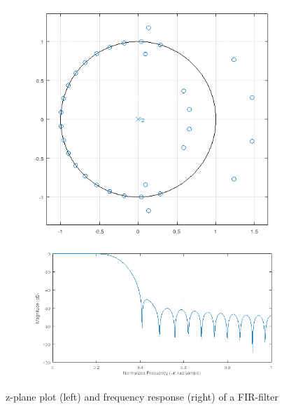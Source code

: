 \begin{figure}[!h]
    \begin{subfigure}[c]{0.35\textwidth}
        \centering
        \includegraphics[width=\textwidth]{img/fir-zplane.png}
    \end{subfigure}
    \begin{subfigure}[c]{0.65\textwidth}
        \centering
        \includegraphics[width=\textwidth]{img/fir-freq.png}
    \end{subfigure}
    \caption{z-plane plot (left) and frequency response (right) of a \ac{FIR}-filter}
    \label{fig:FIR-z-plane-and-freq}
\end{figure}


